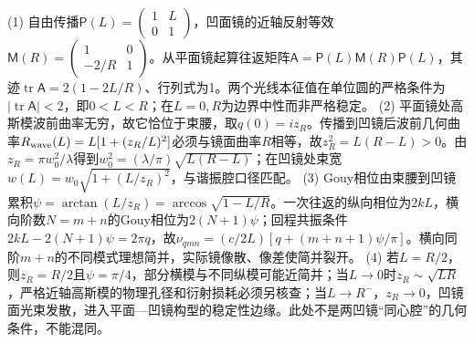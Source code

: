 (1) 自由传播\(\mathsf P(L)=\begin{pmatrix}1&L\\0&1\end{pmatrix}\)，凹面镜的近轴反射等效\(\mathsf M(R)=\begin{pmatrix}1&0\\-2/R&1\end{pmatrix}\)。从平面镜起算往返矩阵\(\mathsf A=\mathsf P(L)\mathsf M(R)\mathsf P(L)\)，其迹\(\operatorname{tr}\mathsf A=2(1-2L/R)\)、行列式为1。两个光线本征值在单位圆的严格条件为\(|\operatorname{tr}\mathsf A|<2\)，即\(0<L<R\)；在\(L=0,R\)为边界中性而非严格稳定。
(2) 平面镜处高斯模波前曲率无穷，故它恰位于束腰，取\(q(0)=iz_R\)。传播到凹镜后波前几何曲率\(R_{\rm wave}(L)=L[1+(z_R/L)^2]\)必须与镜面曲率\(R\)相等，故\(z_R^2=L(R-L)>0\)。由\(z_R=\pi w_0^2/\lambda\)得到\(w_0^2=(\lambda/\pi)\sqrt{L(R-L)}\)；在凹镜处束宽\(w(L)=w_0\sqrt{1+(L/z_R)^2}\)，与谐振腔口径匹配。
(3) Gouy相位由束腰到凹镜累积\(\psi=\arctan(L/z_R)=\arccos\sqrt{1-L/R}\)。一次往返的纵向相位为\(2kL\)，横向阶数\(N=m+n\)的Gouy相位为\(2(N+1)\psi\)；回程共振条件\(2kL-2(N+1)\psi=2\pi q\)，故\(\nu_{qmn}=(c/2L)[q+(m+n+1)\psi/\pi]\)。横向同阶\(m+n\)的不同模式理想简并，实际镜像散、像差使简并裂开。
(4) 若\(L=R/2\)，则\(z_R=R/2\)且\(\psi=\pi/4\)，部分横模与不同纵模可能近简并；当\(L\to0\)时\(z_R\sim\sqrt{LR}\)，严格近轴高斯模的物理孔径和衍射损耗必须另核查；当\(L\to R^-\)，\(z_R\to0\)，凹镜面光束发散，进入平面—凹镜构型的稳定性边缘。此处不是两凹镜“同心腔”的几何条件，不能混同。
